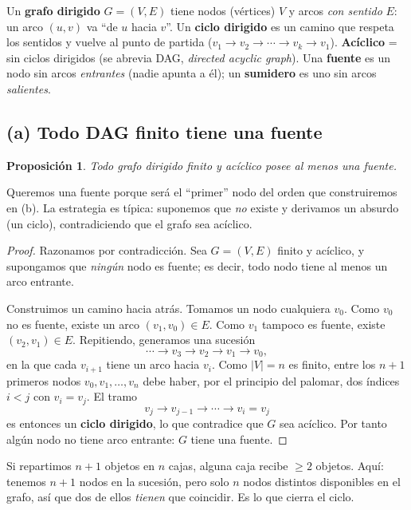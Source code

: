 \documentclass[11pt,a4paper]{article}
\theoremstyle{plain}
\newtheorem{proposicion}{Proposici\'on}
\theoremstyle{definition}
\begin{document}
\begin{concepto}
Un \textbf{grafo dirigido} $G=(V,E)$ tiene nodos (v\'ertices) $V$ y arcos
\emph{con sentido} $E$: un arco $(u,v)$ va ``de $u$ hacia $v$''. Un \textbf{ciclo
dirigido} es un camino que respeta los sentidos y vuelve al punto de partida
($v_1\to v_2\to\cdots\to v_k\to v_1$). \textbf{Ac\'iclico} = sin ciclos dirigidos
(se abrevia DAG, \emph{directed acyclic graph}). Una \textbf{fuente} es un nodo
sin arcos \emph{entrantes} (nadie apunta a \'el); un \textbf{sumidero} es uno sin
arcos \emph{salientes}.
\end{concepto}

\subsection*{(a) Todo DAG finito tiene una fuente}

\begin{proposicion}
Todo grafo dirigido finito y ac\'iclico posee al menos una \emph{fuente}.
\end{proposicion}

\begin{porque}
Queremos una fuente porque ser\'a el ``primer'' nodo del orden que construiremos en
(b). La estrategia es t\'ipica: suponemos que \emph{no} existe y derivamos un
absurdo (un ciclo), contradiciendo que el grafo sea ac\'iclico.
\end{porque}

\begin{proof}
Razonamos por contradicci\'on. Sea $G=(V,E)$ finito y ac\'iclico, y supongamos que
\emph{ning\'un} nodo es fuente; es decir, todo nodo tiene al menos un arco entrante.

Construimos un camino hacia atr\'as. Tomamos un nodo cualquiera $v_0$. Como $v_0$ no
es fuente, existe un arco $(v_1,v_0)\in E$. Como $v_1$ tampoco es fuente, existe
$(v_2,v_1)\in E$. Repitiendo, generamos una sucesi\'on
\[
\cdots \to v_3 \to v_2 \to v_1 \to v_0,
\]
en la que cada $v_{i+1}$ tiene un arco hacia $v_i$. Como $|V|=n$ es finito, entre
los $n+1$ primeros nodos $v_0,v_1,\dots,v_n$ debe haber, por el principio del
palomar, dos \'indices $i<j$ con $v_i=v_j$. El tramo
\[
v_j \to v_{j-1}\to \cdots \to v_i = v_j
\]
es entonces un \textbf{ciclo dirigido}, lo que contradice que $G$ sea ac\'iclico.
Por tanto alg\'un nodo no tiene arco entrante: $G$ tiene una fuente.
\end{proof}

\begin{concepto}
Si repartimos $n+1$ objetos en $n$ cajas, alguna caja recibe $\ge 2$ objetos. Aqu\'i:
tenemos $n+1$ nodos en la sucesi\'on, pero solo $n$ nodos distintos disponibles en el
grafo, as\'i que dos de ellos \emph{tienen} que coincidir. Es lo que cierra el ciclo.
\end{concepto}
\end{document}
